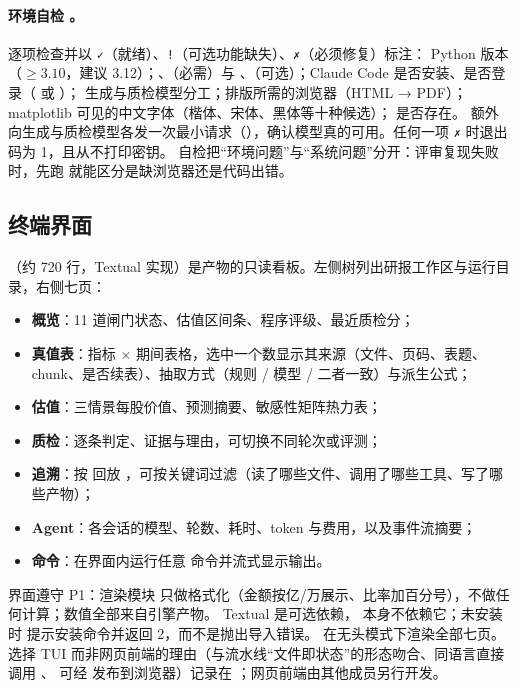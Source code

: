 \paragraph{环境自检 。} 逐项检查并以 \texttt{✓}（就绪）、\texttt{!}（可选功能缺失）、\texttt{✗}（必须修复）标注：
Python 版本（$\ge3.10$，建议 3.12）；、（必需）与 、（可选）；Claude Code 是否安装、是否登录（ 或 ）；
生成与质检模型分工；排版所需的浏览器（HTML → PDF）；matplotlib 可见的中文字体（楷体、宋体、黑体等十种候选）； 是否存在。
 额外向生成与质检模型各发一次最小请求（），确认模型真的可用。任何一项 \texttt{✗} 时退出码为 1，且从不打印密钥。
自检把“环境问题”与“系统问题”分开：评审复现失败时，先跑  就能区分是缺浏览器还是代码出错。

\subsection{终端界面}
\label{sec:arch-tui}

（约 720 行，Textual 实现）是产物的只读看板。左侧树列出研报工作区与运行目录，右侧七页：

\begin{itemize}
  \item \textbf{概览}：11 道闸门状态、估值区间条、程序评级、最近质检分；
  \item \textbf{真值表}：指标 $\times$ 期间表格，选中一个数显示其来源（文件、页码、表题、chunk、是否续表）、抽取方式（规则 / 模型 / 二者一致）与派生公式；
  \item \textbf{估值}：三情景每股价值、预测摘要、敏感性矩阵热力表；
  \item \textbf{质检}：逐条判定、证据与理由，可切换不同轮次或评测；
  \item \textbf{追溯}：按  回放 ，可按关键词过滤（读了哪些文件、调用了哪些工具、写了哪些产物）；
  \item \textbf{Agent}：各会话的模型、轮数、耗时、token 与费用，以及事件流摘要；
  \item \textbf{命令}：在界面内运行任意  命令并流式显示输出。
\end{itemize}

界面遵守 P1：渲染模块  只做格式化（金额按亿/万展示、比率加百分号），不做任何计算；数值全部来自引擎产物。
Textual 是可选依赖， 本身不依赖它；未安装时  提示安装命令并返回 2，而不是抛出导入错误。
 在无头模式下渲染全部七页。选择 TUI 而非网页前端的理由（与流水线“文件即状态”的形态吻合、同语言直接调用 、
可经  发布到浏览器）记录在 ；网页前端由其他成员另行开发。

